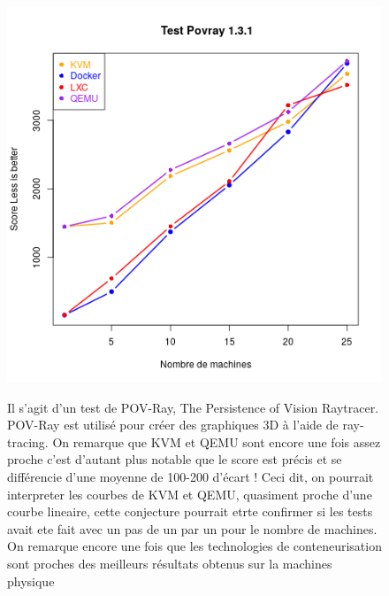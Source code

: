 \begin{figure}[h]
   \begin{minipage}[c]{.46\linewidth}
	  \includegraphics[scale=0.55]{resultats/povray.png}
   \end{minipage} \hfill
   \begin{minipage}[c]{.46\linewidth}
   	  Il s'agit d'un test de POV-Ray, The Persistence of Vision Raytracer. POV-Ray est utilisé pour créer des graphiques 3D à l'aide de ray-tracing. On remarque que KVM et QEMU sont encore une fois assez proche c'est d'autant plus notable que le score est précis et se différencie d'une moyenne de 100-200 d’écart ! Ceci dit, on pourrait interpreter les courbes de KVM et QEMU, quasiment proche d'une courbe lineaire, cette conjecture pourrait etrte confirmer si les tests avait ete fait avec un pas de un par un pour le nombre de machines. 
      On remarque encore une fois que les technologies de conteneurisation sont proches des meilleurs résultats obtenus sur la machines physique
   \end{minipage}
\end{figure}

